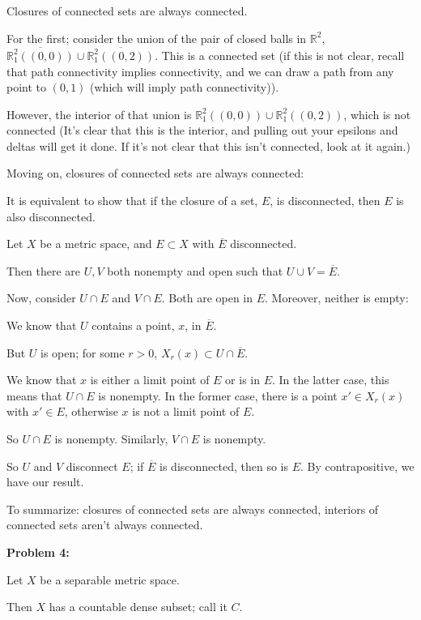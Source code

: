 \documentclass[a4paper,12pt]{article}
\newcommand{\tab}{\hspace{4mm}} %
\newcommand{\shunt}{\vspace{20mm}}
\newcommand{\R}{\mathbb{R}}
\begin{document}
Closures of connected sets are always connected. 

For the first; consider the union of the pair of closed balls in $\R^2$, $\overline{\R^2_1((0,0))} \cup \overline{\R^2_1((0,2))}$. This is a connected set (if this is not clear, recall that path connectivity implies connectivity, and we can draw a path from any point to $(0,1)$ (which will imply path connectivity)).

However, the interior of that union is $\R^2_1((0,0)) \cup \R^2_1((0,2))$, which is not connected (It's clear that this is the interior, and pulling out your epsilons and deltas will get it done. If it's not clear that this isn't connected, look at it again.)

Moving on, closures of connected sets are always connected:

\tab It is equivalent to show that if the closure of a set, $E$, is disconnected, then $E$ is also disconnected.

\tab Let $X$ be a metric space, and $E \subset X$ with $\overline{E}$ disconnected.

\tab  Then there are $U,V$ both nonempty and open such that $U \cup V = \overline{E}$.

\tab Now, consider $U \cap E$ and $V \cap E$. Both are open in $E$. Moreover, neither is empty:

\tab \tab We know that $U$ contains a point, $x$, in $\overline{E}$.

\tab \tab But $U$ is open; for some $r >0$, $X_r(x) \subset U \cap \overline{E}$.

\tab \tab We know that $x$ is either a limit point of $E$ or is in $E$. In the latter case, this means that $U \cap E$ is nonempty. In the former case, there is a point $x' \in X_r(x)$ with $x' \in E$, otherwise $x$ is not a limit point of $E$. 

\tab \tab So $U \cap E$ is nonempty. Similarly, $V \cap E$ is nonempty.

\tab \tab So $U$ and $V$ disconnect $E$; if $\overline{E}$ is disconnected, then so is $E$. By contrapositive, we have our result.

To summarize: closures of connected sets are always connected, interiors of connected sets aren't always connected.

\shunt

{\bf Problem 4:}

Let $X$ be a separable metric space.

Then $X$ has a countable dense subset; call it $C$.
\end{document}
